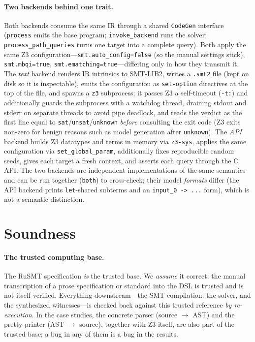 \documentclass[11pt,a4paper]{article}
\theoremstyle{definition}
\theoremstyle{remark}
\newcommand{\rusmt}{RuSMT}
\newcommand{\code}[1]{\texttt{#1}}
\begin{document}
\paragraph{Two backends behind one trait.}
Both backends consume the same IR through a shared \code{CodeGen} interface
(\code{process} emits the base program; \code{invoke\_backend} runs the solver;
\code{process\_path\_queries} turns one target into a complete query). Both apply
the same Z3 configuration---\code{smt.auto\_config=false} (so the manual
settings stick), \code{smt.mbqi=true}, \code{smt.ematching=true}---differing only
in how they transmit it. The \emph{text} backend renders IR intrinsics to
SMT-LIB2, writes a \code{.smt2} file (kept on disk so it is inspectable), emits
the configuration as \code{set-option} directives at the top of the file, and
spawns a \code{z3} subprocess; it passes Z3 a self-timeout (\code{-t:}) and
additionally guards the subprocess with a watchdog thread, draining stdout and
stderr on separate threads to avoid pipe deadlock, and reads the verdict as the
first line equal to \code{sat}/\code{unsat}/\code{unknown} \emph{before}
consulting the exit code (Z3 exits non-zero for benign reasons such as model
generation after \code{unknown}). The \emph{API} backend builds Z3 datatypes
and terms in memory via \code{z3-sys}, applies the same configuration via
\code{set\_global\_param}, additionally fixes reproducible random seeds, gives
each target a fresh context, and asserts each query through the C API. The two
backends are independent implementations of the same semantics and can be run
together (\code{both}) to cross-check; their model \emph{formats} differ (the
API backend prints \code{let}-shared subterms and an \code{input\_0 -> ...}
form), which is not a semantic distinction.

\section{Soundness}
\label{sec:soundness}

\paragraph{The trusted computing base.}
The \rusmt{} specification \emph{is} the trusted base. We \emph{assume} it
correct: the manual transcription of a prose specification or standard into the
DSL is trusted and is not itself verified. Everything downstream---the SMT
compilation, the solver, and the synthesized witnesses---is checked back against
this trusted reference \emph{by re-execution}. In the case studies, the concrete
parser (source $\to$ AST) and the pretty-printer (AST $\to$ source), together
with Z3 itself, are also part of the trusted base; a bug in any of them is a bug
in the results.
\end{document}
